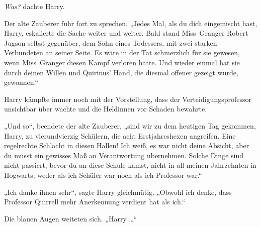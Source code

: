 \emph{Was?} dachte Harry.

Der alte Zauberer fuhr fort zu sprechen.
„Jedes Mal, als du dich eingemischt hast, Harry, eskalierte die Sache weiter und weiter. Bald stand Miss~Granger Robert Jugson selbst gegenüber, dem Sohn eines Todessers, mit zwei starken Verbündeten an seiner Seite. Es wäre in der Tat schmerzlich für sie gewesen, wenn Miss~Granger diesen Kampf verloren hätte. Und wieder einmal hat sie durch deinen Willen und Quirinus’ Hand, die diesmal offener gezeigt wurde, gewonnen.“

Harry kämpfte immer noch mit der Vorstellung, dass der Verteidigungsprofessor unsichtbar über \SPHEW wachte und die Heldinnen vor Schaden bewahrte.

„Und so“, beendete der alte Zauberer, „sind wir zu dem heutigen Tag gekommen, Harry, zu vierundvierzig Schülern, die acht Erstjahreshexen angreifen. Eine regelrechte Schlacht in diesen Hallen! Ich weiß, es war nicht deine Absicht, aber du musst ein gewisses Maß an Verantwortung übernehmen. Solche Dinge sind nicht passiert, bevor du an diese Schule kamst, nicht in all meinen Jahrzehnten in Hogwarts; weder als ich Schüler war noch als ich Professor war.“

„Ich danke ihnen sehr“, sagte Harry gleichmütig.
„Obwohl ich denke, dass Professor Quirrell mehr Anerkennung verdient hat als ich.“

Die blauen Augen weiteten sich.
„Harry …“

